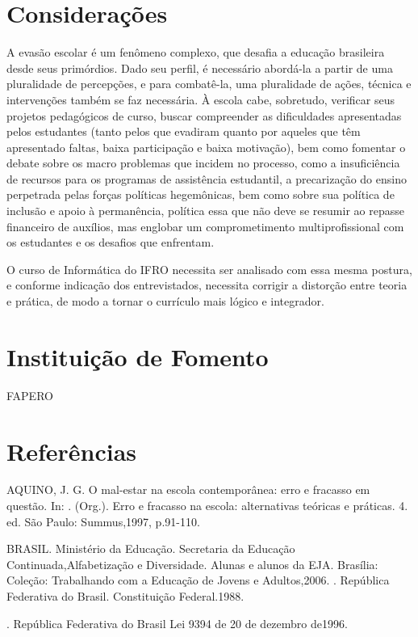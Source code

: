 \documentclass[article,12pt,onesidea,4paper,english,brazil]{abntex2}
\begin{document}
	
	\section*{Considerações}
	

A evasão escolar é um fenômeno complexo, que desafia a educação brasileira desde seus primórdios. Dado seu perfil, é necessário abordá-la a partir de uma pluralidade de percepções, e para combatê-la, uma pluralidade de ações, técnica e intervenções também se faz necessária. À escola cabe, sobretudo,  verificar seus projetos pedagógicos de curso, buscar compreender as dificuldades apresentadas pelos estudantes (tanto pelos que evadiram quanto por aqueles que têm apresentado faltas, baixa participação e baixa motivação), bem como fomentar o debate sobre os macro problemas que incidem no processo, como a insuficiência de recursos para os programas de assistência estudantil, a precarização do ensino perpetrada pelas forças políticas hegemônicas, bem como sobre sua política de inclusão e apoio à permanência, política essa que não deve se resumir ao repasse financeiro de auxílios, mas englobar um comprometimento multiprofissional com os estudantes e os desafios que enfrentam.

O curso de Informática do IFRO necessita ser analisado com essa mesma postura, e conforme indicação dos entrevistados, necessita corrigir a distorção entre teoria e prática, de modo a tornar o currículo mais lógico e integrador.

	
	\section*{Instituição de Fomento}
	
	FAPERO
	\section*{Referências}
	
		\noindent AQUINO, J. G. O mal-estar na escola contemporânea: erro e fracasso em questão. In:	. (Org.). Erro e fracasso na escola: alternativas teóricas e práticas. 4. ed. São Paulo: Summus,1997, p.91-110.
	
	\noindent BRASIL. Ministério da Educação. Secretaria da Educação Continuada,Alfabetização e Diversidade. Alunas e alunos da EJA. Brasília: Coleção: Trabalhando com a Educação de Jovens e Adultos,2006.
		. República Federativa do Brasil. Constituição Federal.1988.
	
	. República Federativa do Brasil Lei 9394 de 20 de dezembro de1996.
	
\end{document}
